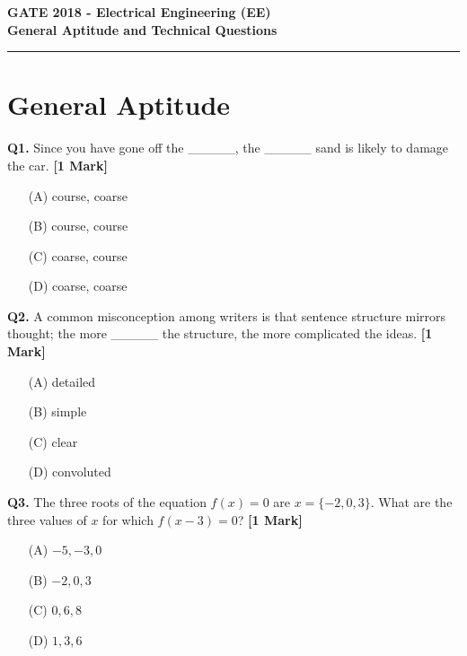 \documentclass[11pt]{article}
\newcommand{\questiona}[2]{
    \noindent\textbf{Q#2.} #1 \hfill \textbf{[1 Mark]}
}
\begin{document}
\begin{center}
    \Large\textbf{GATE 2018 - Electrical Engineering (EE)} \\
    \large\textbf{General Aptitude and Technical Questions} \\
    \rule{\textwidth}{0.5pt} %
\end{center}

\vspace{0.5cm}

\section*{General Aptitude}

\questiona{Since you have gone off the \_\_\_\_\_, the \_\_\_\_\_ sand is likely to damage the car.}{1}
\begin{enumerate}
    \item[(A)] course, coarse
    \item[(B)] course, course
    \item[(C)] coarse, course
    \item[(D)] coarse, coarse
\end{enumerate}
\vspace{0.5cm}

\questiona{A common misconception among writers is that sentence structure mirrors thought; the more \_\_\_\_\_ the structure, the more complicated the ideas.}{2}
\begin{enumerate}
    \item[(A)] detailed
    \item[(B)] simple
    \item[(C)] clear
    \item[(D)] convoluted
\end{enumerate}
\vspace{0.5cm}

\questiona{The three roots of the equation \( f(x) = 0 \) are \( x = \{-2, 0, 3\} \). What are the three values of \( x \) for which \( f(x-3) = 0 \)?}{3}
\begin{enumerate}
    \item[(A)] \( -5, -3, 0 \)
    \item[(B)] \( -2, 0, 3 \)
    \item[(C)] \( 0, 6, 8 \)
    \item[(D)] \( 1, 3, 6 \)
\end{enumerate}
\vspace{0.5cm}
\end{document}
